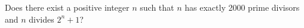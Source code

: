 Does there exist a positive integer $ n$ such that $ n$ has exactly 2000 prime divisors and $ n$ divides $ 2^n + 1$?